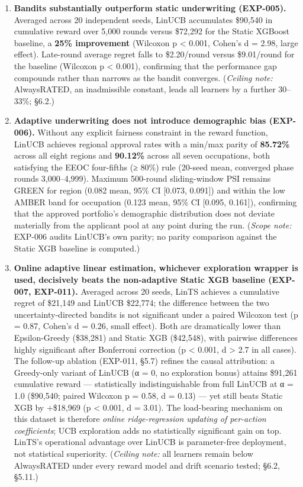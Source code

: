\begin{enumerate}[label=\textbf{Finding \arabic*.}, leftmargin=*, itemsep=6pt]
\item \textbf{Bandits substantially outperform static underwriting (EXP-005).} Averaged across 20 independent seeds, LinUCB accumulates \$90,540 in cumulative reward over 5,000 rounds versus \$72,292 for the Static XGBoost baseline, a \textbf{25\% improvement} (Wilcoxon p \textless{} 0.001, Cohen's d = 2.98, large effect). Late-round average regret falls to \$2.20/round versus \$9.01/round for the baseline (Wilcoxon p \textless{} 0.001), confirming that the performance gap compounds rather than narrows as the bandit converges. (\emph{Ceiling note:} AlwaysRATED, an inadmissible constant, leads all learners by a further 30--33\%; §6.2.)

\item \textbf{Adaptive underwriting does not introduce demographic bias (EXP-006).} Without any explicit fairness constraint in the reward function, LinUCB achieves regional approval rates with a min/max parity of \textbf{85.72\%} across all eight regions and \textbf{90.12\%} across all seven occupations, both satisfying the EEOC four-fifths (≥ 80\%) rule (20-seed mean, converged phase rounds 3,000--4,999). Maximum 500-round sliding-window PSI remains GREEN for region (0.082 mean, 95\% CI {[}0.073, 0.091{]}) and within the low AMBER band for occupation (0.123 mean, 95\% CI {[}0.095, 0.161{]}), confirming that the approved portfolio's demographic distribution does not deviate materially from the applicant pool at any point during the run. (\emph{Scope note:} EXP-006 audits LinUCB's own parity; no parity comparison against the Static XGB baseline is computed.)

\item \textbf{Online adaptive linear estimation, whichever exploration wrapper is used, decisively beats the non-adaptive Static XGB baseline (EXP-007, EXP-011).} Averaged across 20 seeds, LinTS achieves a cumulative regret of \$21,149 and LinUCB \$22,774; the difference between the two uncertainty-directed bandits is not significant under a paired Wilcoxon test (p = 0.87, Cohen's d = 0.26, small effect). Both are dramatically lower than Epsilon-Greedy (\$38,281) and Static XGB (\$42,548), with pairwise differences highly significant after Bonferroni correction (p \textless{} 0.001, \textbar d\textbar{} \textgreater{} 2.7 in all cases). The follow-up ablation (EXP-011, §5.7) refines the causal attribution: a Greedy-only variant of LinUCB (α = 0, no exploration bonus) attains \$91,261 cumulative reward --- statistically indistinguishable from full LinUCB at α = 1.0 (\$90,540; paired Wilcoxon p = 0.58, d = 0.13) --- yet still beats Static XGB by +\$18,969 (p \textless{} 0.001, d = 3.01). The load-bearing mechanism on this dataset is therefore \emph{online ridge-regression updating of per-action coefficients}; UCB exploration adds no statistically significant gain on top. LinTS's operational advantage over LinUCB is parameter-free deployment, not statistical superiority. (\emph{Ceiling note:} all learners remain below AlwaysRATED under every reward model and drift scenario tested; §6.2, §5.11.)


\end{enumerate}
